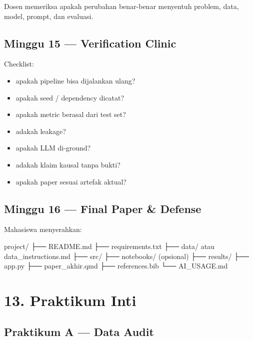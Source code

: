 \documentclass[
  indonesian,
  letterpaper,
  DIV=11,
  numbers=noendperiod]{scrreprt}
\newenvironment{Shaded}{\begin{snugshade}}{\end{snugshade}}
\newcommand{\NormalTok}[1]{\textcolor[rgb]{0.00,0.23,0.31}{#1}}
\providecommand{\tightlist}{%
  \setlength{\itemsep}{0pt}\setlength{\parskip}{0pt}}
\begin{document}
Dosen memeriksa apakah perubahan benar-benar menyentuh problem, data,
model, prompt, dan evaluasi.

\section{Minggu 15 --- Verification
Clinic}\label{minggu-15-verification-clinic}

Checklist:

\begin{itemize}
\tightlist
\item
  apakah pipeline bisa dijalankan ulang?
\item
  apakah seed / dependency dicatat?
\item
  apakah metric berasal dari test set?
\item
  adakah leakage?
\item
  apakah LLM di-ground?
\item
  adakah klaim kausal tanpa bukti?
\item
  apakah paper sesuai artefak aktual?
\end{itemize}

\section{Minggu 16 --- Final Paper \&
Defense}\label{minggu-16-final-paper-defense}

Mahasiswa menyerahkan:

\begin{Shaded}
\begin{Highlighting}[]
\NormalTok{project/}
\NormalTok{├── README.md}
\NormalTok{├── requirements.txt}
\NormalTok{├── data/ atau data\_instructions.md}
\NormalTok{├── src/}
\NormalTok{├── notebooks/ (opsional)}
\NormalTok{├── results/}
\NormalTok{├── app.py}
\NormalTok{├── paper\_akhir.qmd}
\NormalTok{├── references.bib}
\NormalTok{└── AI\_USAGE.md}
\end{Highlighting}
\end{Shaded}


\chapter{13. Praktikum Inti}\label{praktikum-inti}

\section{Praktikum A --- Data Audit}\label{praktikum-a-data-audit}
\end{document}
